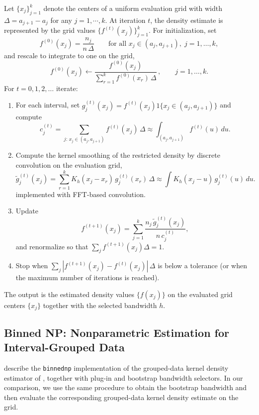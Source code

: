 \documentclass[12pt]{article} %
\begin{document}
Let $\{x_j\}_{j=1}^k$ denote the centers of a uniform evaluation grid with width $\Delta = a_{j+1} - a_j$ for any $j = 1,\cdots,k$.
At iteration $t$, the density estimate is represented by the grid values $\{f^{(t)}(x_j)\}_{j=1}^k$.
For initialization, set
\[
f^{(0)}(x_j)=\frac{n_j}{n\,\Delta}\qquad \text{for all } x_j\in (a_j,a_{j+1}),\; j=1,\dots,k,
\]
and rescale to integrate to one on the grid,
\[
f^{(0)}(x_j)\leftarrow \frac{f^{(0)}(x_j)}{\sum_{r=1}^k f^{(0)}(x_r)\,\Delta}\,,
\qquad j=1,\dots,k.
\]
For $t=0,1,2,\dots$ iterate:
\begin{enumerate}
\item For each interval, set $g^{(t)}_j(x_j)=f^{(t)}(x_j)1\{x_j\in (a_j,a_{j+1})\}$ and compute
\[
c^{(t)}_j
= \sum_{j:\,x_j\in (a_j,a_{j+1})} f^{(t)}(x_j)\,\Delta
\approx \int_{(a_j,a_{j+1})} f^{(t)}(u)\,du .
\]
\item Compute the kernel smoothing of the restricted density by discrete convolution on the evaluation grid,
\[
\tilde g^{(t)}_j(x_j)
= \sum_{r=1}^k K_h(x_j-x_r)\,g^{(t)}_j(x_r)\,\Delta
\approx \int K_h(x_j-u)\,g^{(t)}_j(u)\,du .
\]
implemented with FFT-based convolution.
\item Update
\[
f^{(t+1)}(x_j)=\sum_{j=1}^k \frac{n_j\,\tilde g^{(t)}_j(x_j)}{n\,c^{(t)}_j},
\]
and renormalize so that $\sum_j f^{(t+1)}(x_j)\Delta =1$.
\item Stop when $\sum_j |f^{(t+1)}(x_j)-f^{(t)}(x_j)|\,\Delta$ is below a tolerance (or when the maximum number of iterations is reached).
\end{enumerate}
The output is the estimated density values $\{f(x_j)\}$ on the evaluated grid centers $\{x_j\}$ together with the selected bandwidth $h$.


\subsection{Binned NP: Nonparametric Estimation for Interval-Grouped Data}

\cite{BarreiroUresEtAl2019} describe the \texttt{binnednp} \citep{binnednp2019} implementation of the grouped-data kernel density estimator of \cite{reyes2016nonparametric}, together with plug-in and bootstrap bandwidth selectors. In our comparison, we use the same procedure to obtain the bootstrap bandwidth and then evaluate the corresponding grouped-data kernel density estimate on the grid. 
\end{document}
